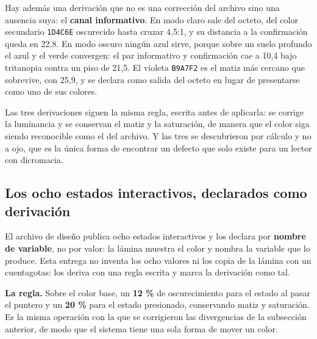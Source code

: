 Hay además una derivación que no es una corrección del archivo sino una ausencia suya: el
\textbf{canal informativo}. En modo claro sale del octeto, del color secundario \texttt{1D4C6E}
oscurecido hasta cruzar 4{,}5:1, y su distancia a la confirmación queda en 22{,}8. En modo oscuro
ningún azul sirve, porque sobre un suelo profundo el azul y el verde convergen: el par informativo y
confirmación cae a 10{,}4 bajo tritanopia contra un piso de 21{,}5. El violeta \texttt{B9A7F2} es el
matiz más cercano que sobrevive, con 25{,}9, y se declara como salida del octeto en lugar de
presentarse como uno de sus colores.

Las tres derivaciones siguen la misma regla, escrita antes de aplicarla: se corrige la luminancia y
se conservan el matiz y la saturación, de manera que el color siga siendo reconocible como el del
archivo. Y las tres se descubrieron por cálculo y no a ojo, que es la única forma de encontrar un
defecto que solo existe para un lector con dicromacia.

\subsection{Los ocho estados interactivos, declarados como derivación}

El archivo de diseño publica ocho estados interactivos y los declara por \textbf{nombre de
variable}, no por valor: la lámina muestra el color y nombra la variable que lo produce. Esta
entrega no inventa los ocho valores ni los copia de la lámina con un cuentagotas: los deriva con
una regla escrita y marca la derivación como tal.

\textbf{La regla.} Sobre el color base, un \textbf{12 \%} de oscurecimiento para el estado al pasar
el puntero y un \textbf{20 \%} para el estado presionado, conservando matiz y saturación. Es la
misma operación con la que se corrigieron las divergencias de la subsección anterior, de modo que
el sistema tiene una sola forma de mover un color.

